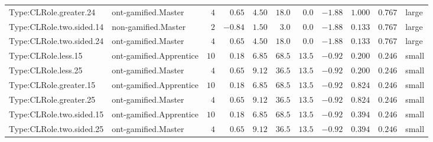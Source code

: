 \documentclass[6pt,a4paper]{article}
\begin{document}
{\begin{longtable}{llrrrrrrrrl}
Type:CLRole.greater.24&ont-gamified.Master&$ 4$&$ 0.65$&$ 4.50$&$ 18.0$&$ 0.0$&$-1.88$&$1.000$&$0.767$&large\tabularnewline
Type:CLRole.two.sided.14&non-gamified.Master&$ 2$&$-0.84$&$ 1.50$&$  3.0$&$ 0.0$&$-1.88$&$0.133$&$0.767$&large\tabularnewline
Type:CLRole.two.sided.24&ont-gamified.Master&$ 4$&$ 0.65$&$ 4.50$&$ 18.0$&$ 0.0$&$-1.88$&$0.133$&$0.767$&large\tabularnewline
Type:CLRole.less.15&ont-gamified.Apprentice&$10$&$ 0.18$&$ 6.85$&$ 68.5$&$13.5$&$-0.92$&$0.200$&$0.246$&small\tabularnewline
Type:CLRole.less.25&ont-gamified.Master&$ 4$&$ 0.65$&$ 9.12$&$ 36.5$&$13.5$&$-0.92$&$0.200$&$0.246$&small\tabularnewline
Type:CLRole.greater.15&ont-gamified.Apprentice&$10$&$ 0.18$&$ 6.85$&$ 68.5$&$13.5$&$-0.92$&$0.824$&$0.246$&small\tabularnewline
Type:CLRole.greater.25&ont-gamified.Master&$ 4$&$ 0.65$&$ 9.12$&$ 36.5$&$13.5$&$-0.92$&$0.824$&$0.246$&small\tabularnewline
\newpage
Type:CLRole.two.sided.15&ont-gamified.Apprentice&$10$&$ 0.18$&$ 6.85$&$ 68.5$&$13.5$&$-0.92$&$0.394$&$0.246$&small\tabularnewline
Type:CLRole.two.sided.25&ont-gamified.Master&$ 4$&$ 0.65$&$ 9.12$&$ 36.5$&$13.5$&$-0.92$&$0.394$&$0.246$&small\tabularnewline
\hline
\end{longtable}}
\end{document}
